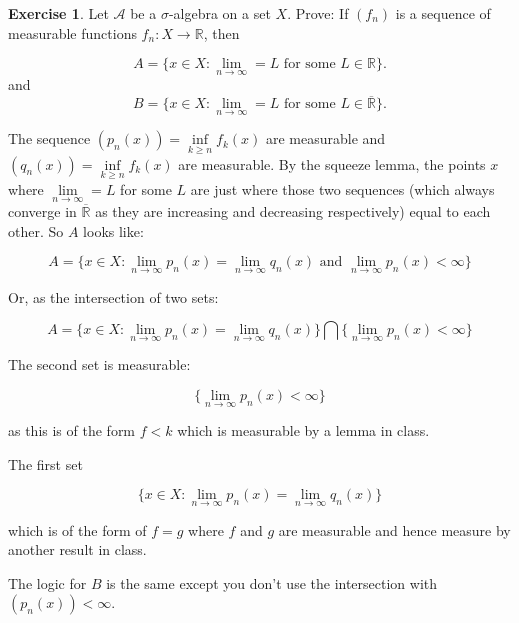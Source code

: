 \documentclass[11pt,oneside]{article}
\numberwithin{equation}{section}
\theoremstyle{definition}
\newtheorem{exercise}{Exercise}
\def\OR{\overline{\mathbb{R}}}
\def\RR{\mathbb{R}}
\def\fancyA{\mathscr{A}}
\begin{document}
\begin{exercise}
  Let $\fancyA$ be a $\sigma$-algebra on a set $X$. Prove: If $(f_n)$ is a sequence of
  measurable functions $f_n : X \to \RR$, then

  \[
  A = \{ x \in X : \lim \limits_{n \to \infty} = L \textrm{ for some } L \in \RR \}.
  \]
  and
  \[
  B = \{ x \in X : \lim \limits_{n \to \infty} = L \textrm{ for some } L \in \OR \}.
  \]
  
\end{exercise}
\begin{solution}
  The sequence $(p_n (x)) = \inf \limits _{k \geq n} f_k (x)$ are
  measurable and $ (q_n(x)) = \inf \limits _{k \geq n} f_k (x)$ are
  measurable. By the squeeze lemma, the points $x$
  where $\lim \limits _{n \to \infty} = L$ for some $L$ are
  just where those two
  sequences (which always converge in $\OR$ as they are
  increasing and decreasing respectively) equal to each other.  So $A$
  looks like:

  \[
  A = \{ x \in X: \lim \limits _ { n \to \infty } p_n(x) = \lim \limits _ {n \to \infty } q_n(x) \textrm{ and }
  \lim \limits _{n \to \infty} p_n(x) < \infty \}
  \]

  Or, as the intersection of two sets:
  
  \[
  A = \{ x \in X: \lim \limits _ { n \to \infty } p_n(x) = \lim \limits _ {n \to \infty } q_n(x) \} \bigcap \{ 
  \lim \limits _{n \to \infty} p_n(x) < \infty \}
  \]

  The second set is measurable:

  \[
  \{ \lim \limits _{n \to \infty} p_n(x) < \infty \}
  \]

  as this is of the form $f < k$ which is measurable by a lemma in class.

  The first set

  \[
  \{ x \in X: \lim \limits _ { n \to \infty } p_n(x) = \lim \limits _ {n \to \infty } q_n(x) \}
  \]

  which is of the form of $f = g$ where $f$ and $g$ are measurable and hence measure by another result in class.

  The logic for $B$ is the same except you don't use the intersection with $(p_n(x)) < \infty$.  
  
  
\end{solution}


\begin{comment}
\begin{exercise}
  problem
\end{exercise}
\begin{solution}
\begin{enumerate}[(a)]
\item
  first answer
\end{enumerate}
\end{solution}
\end{comment}
\end{document}
